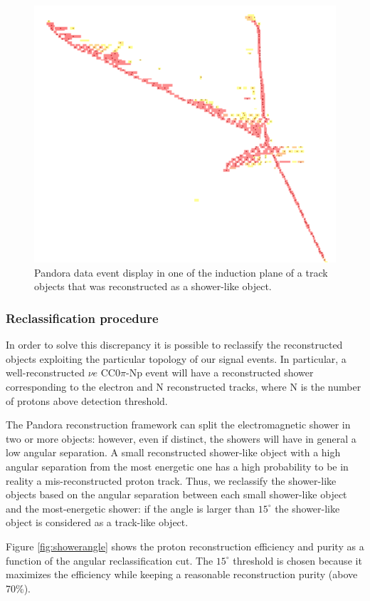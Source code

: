 \begin{figure}[htbp]
\centering
  \includegraphics[width=0.45\linewidth]{figures/pandora.png}
  \caption{Pandora data event display in one of the induction plane of a track objects that was reconstructed as a shower-like object.}
  \label{fig:evdpandora}
\end{figure}

\subsubsection{Reclassification procedure}
In order to solve this discrepancy it is possible to reclassify the reconstructed objects exploiting the particular topology of our signal events. In particular, a well-reconstructed $\nu{e}$ CC0$\pi$-Np event will have a reconstructed shower corresponding to the electron and N reconstructed tracks, where N is the number of protons above detection threshold. 

The Pandora reconstruction framework can split the electromagnetic shower in two or more objects: however, even if distinct, the showers will have in general a low angular separation. A small reconstructed shower-like object with a high angular separation from the most energetic one has a high probability to be in reality a mis-reconstructed proton track. Thus, we reclassify the shower-like objects based on the angular separation between each small shower-like object and the most-energetic shower: if the angle is larger than $15^{\circ}$ the shower-like object is considered as a track-like object.

Figure \ref{fig:showerangle} shows the proton reconstruction efficiency and purity as a function of the angular reclassification cut. The $15^{\circ}$ threshold is chosen because it maximizes the efficiency while keeping a reasonable reconstruction purity (above 70\%).

